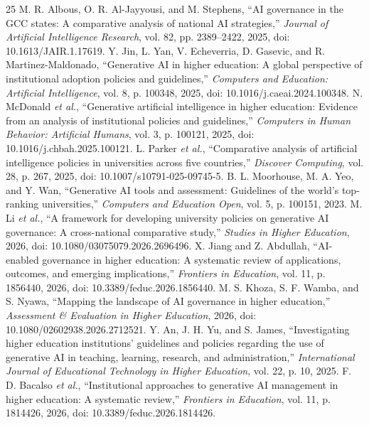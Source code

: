 \documentclass[conference,letterpaper]{IEEEtran}
\begin{document}
\begin{thebibliography}{25}\footnotesize
{} M. R. Albous, O. R. Al-Jayyousi, and M. Stephens, ``AI governance in the GCC states: A comparative analysis of national AI strategies,'' \emph{Journal of Artificial Intelligence Research}, vol. 82, pp. 2389--2422, 2025, doi: 10.1613/JAIR.1.17619.
 Y. Jin, L. Yan, V. Echeverria, D. Gasevic, and R. Martinez-Maldonado, ``Generative AI in higher education: A global perspective of institutional adoption policies and guidelines,'' \emph{Computers and Education: Artificial Intelligence}, vol. 8, p. 100348, 2025, doi: 10.1016/j.caeai.2024.100348.
 N. McDonald \emph{et al.}, ``Generative artificial intelligence in higher education: Evidence from an analysis of institutional policies and guidelines,'' \emph{Computers in Human Behavior: Artificial Humans}, vol. 3, p. 100121, 2025, doi: 10.1016/j.chbah.2025.100121.
 L. Parker \emph{et al.}, ``Comparative analysis of artificial intelligence policies in universities across five countries,'' \emph{Discover Computing}, vol. 28, p. 267, 2025, doi: 10.1007/s10791-025-09745-5.
 B. L. Moorhouse, M. A. Yeo, and Y. Wan, ``Generative AI tools and assessment: Guidelines of the world's top-ranking universities,'' \emph{Computers and Education Open}, vol. 5, p. 100151, 2023.
 M. Li \emph{et al.}, ``A framework for developing university policies on generative AI governance: A cross-national comparative study,'' \emph{Studies in Higher Education}, 2026, doi: 10.1080/03075079.2026.2696496.
 X. Jiang and Z. Abdullah, ``AI-enabled governance in higher education: A systematic review of applications, outcomes, and emerging implications,'' \emph{Frontiers in Education}, vol. 11, p. 1856440, 2026, doi: 10.3389/feduc.2026.1856440.
 M. S. Khoza, S. F. Wamba, and S. Nyawa, ``Mapping the landscape of AI governance in higher education,'' \emph{Assessment \& Evaluation in Higher Education}, 2026, doi: 10.1080/02602938.2026.2712521.
 Y. An, J. H. Yu, and S. James, ``Investigating higher education institutions' guidelines and policies regarding the use of generative AI in teaching, learning, research, and administration,'' \emph{International Journal of Educational Technology in Higher Education}, vol. 22, p. 10, 2025.
 F. D. Bacalso \emph{et al.}, ``Institutional approaches to generative AI management in higher education: A systematic review,'' \emph{Frontiers in Education}, vol. 11, p. 1814426, 2026, doi: 10.3389/feduc.2026.1814426.

\end{thebibliography}
\end{document}
